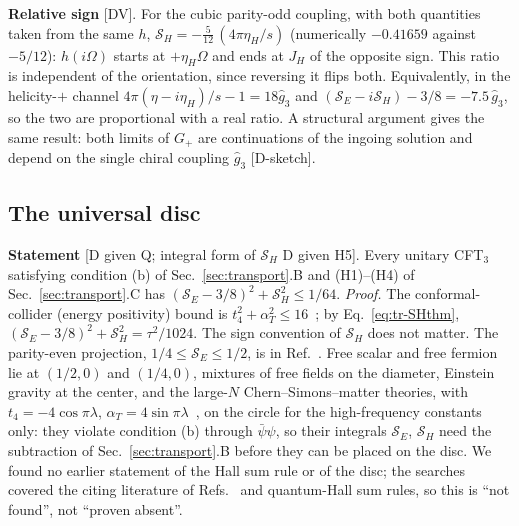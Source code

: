 \textbf{Relative sign} [DV]. For the cubic parity-odd coupling, with both quantities taken from the same $h$,
$\mathcal S_H=-\tfrac5{12}\,(4\pi\eta_H/s)$ (numerically $-0.41659$ against $-5/12$): $h(i\Omega)$ starts at $+\eta_H\Omega$ and
ends at $J_H$ of the opposite sign. This ratio is independent of the orientation, since reversing it flips both. Equivalently,
in the helicity-$+$ channel $4\pi(\eta-i\eta_H)/s-1=18\hat g_3$ and $(\mathcal S_E-i\mathcal S_H)-3/8=-7.5\,\hat g_3$, so the two
are proportional with a real ratio. A structural argument gives the same result: both limits of $G_+$ are continuations of the
ingoing solution and depend on the single chiral coupling $\hat g_3$ [D-sketch].

\subsection{The universal disc}
\textbf{Statement} [D given Q; integral form of $\mathcal S_H$ D given H5]. Every unitary CFT$_3$ satisfying condition (b) of Sec.~\ref{sec:transport}.B and (H1)--(H4) of
Sec.~\ref{sec:transport}.C has $(\mathcal S_E-3/8)^2+\mathcal S_H^2\le1/64$. \emph{Proof.} The conformal-collider (energy positivity)
bound is $t_4^2+\alpha_T^2\le16$~\cite{CDPrakash}; by Eq.~\eqref{eq:tr-SHthm}, $(\mathcal S_E-3/8)^2+\mathcal S_H^2=\tau^2/1024$. The sign convention of $\mathcal S_H$ does not matter.
The parity-even projection, $1/4\le\mathcal S_E\le1/2$, is in Ref.~\cite{Chowdhury:2016hjy}. Free scalar and free fermion lie at
$(1/2,0)$ and $(1/4,0)$, mixtures of free fields on the diameter, Einstein gravity at the center, and the large-$N$
Chern--Simons--matter theories, with $t_4=-4\cos\pi\lambda$, $\alpha_T=4\sin\pi\lambda$~\cite{CDPrakash}, on the circle
for the high-frequency constants only: they violate condition (b) through $\bar\psi\psi$, so their integrals $\mathcal S_E$,
$\mathcal S_H$ need the subtraction of Sec.~\ref{sec:transport}.B before they can be placed on the disc. We found no earlier statement of the Hall sum rule or of the disc; the
searches covered the citing literature of Refs.~\cite{Chowdhury:2016hjy,CDPrakash} and quantum-Hall sum rules, so this is ``not
found'', not ``proven absent''.

